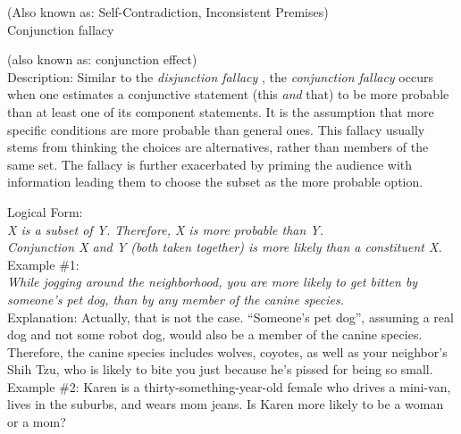 \documentclass[a4paper,12pt,single,pdftex]{scrartcl}
\begin{document}
    
  
    
      (Also known as: Self-Contradiction, Inconsistent Premises)
    \\

  

Conjunction fallacy
    
      (also known as: conjunction effect)
    \\

  
    Description: Similar to the {\it disjunction fallacy} , the {\em conjunction fallacy} occurs when one estimates a conjunctive statement (this {\em and}  that) to be more probable than at least one of its component statements. It is the assumption that more specific conditions are more probable than general ones.  This fallacy usually stems from thinking the choices are alternatives, rather than members of the same set.  The fallacy is further exacerbated by priming the audience with information leading them to choose the subset as the more probable option.

    
      Logical Form:
    \\

    
      {\em X is a subset of Y. \newline
Therefore, X is more probable than Y.}
    \\

    
      {\em Conjunction X and Y (both taken together) is more likely than a constituent X.}
    \\

    
      Example \#1:
    \\

    
      {\em While jogging around the neighborhood, you are more likely to get bitten by someone’s pet dog, than by any member of the canine species.}
    \\

    
      Explanation: Actually, that is not the case.  “Someone’s pet dog”, assuming a real dog and not some robot dog, would also be a member of the canine species.  Therefore, the canine species includes wolves,  coyotes, as well as your neighbor’s Shih Tzu, who is likely to bite you just because he’s pissed for being so small.
    \\

    
      Example \#2: Karen is a thirty-something-year-old female who drives a mini-van, lives in the suburbs, and wears mom jeans. Is Karen more likely to be a woman or a mom?
    \\
\end{document}
